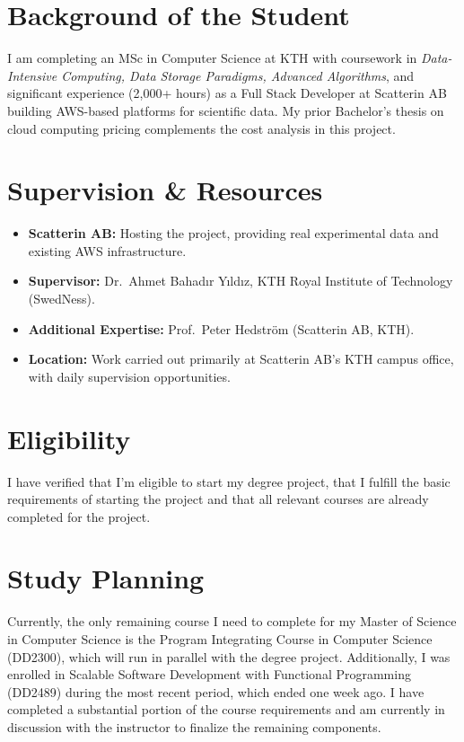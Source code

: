\documentclass{article}
\begin{document}
\section{Background of the Student}
I am completing an MSc in Computer Science at KTH with coursework in \emph{Data-Intensive Computing, Data Storage Paradigms, Advanced Algorithms}, and significant experience (2,000+ hours) as a Full Stack Developer at Scatterin AB building AWS-based platforms for scientific data. My prior Bachelor’s thesis on cloud computing pricing complements the cost analysis in this project.

\section{Supervision \& Resources}
\begin{itemize}
    \item \textbf{Scatterin AB:} Hosting the project, providing real experimental data and existing AWS infrastructure.
    \item \textbf{Supervisor:} Dr.~Ahmet Bahadır Yıldız, KTH Royal Institute of Technology (SwedNess).
    \item \textbf{Additional Expertise:} Prof.~Peter Hedström (Scatterin AB, KTH).
    \item \textbf{Location:} Work carried out primarily at Scatterin AB’s KTH campus office, with daily supervision opportunities.
\end{itemize}

\section{Eligibility}
I have verified that I'm eligible to start my degree project, that I fulfill the basic requirements of starting the project and that all relevant courses are already completed for the project.

\section{Study Planning}
Currently, the only remaining course I need to complete for my Master of Science in Computer Science is the Program Integrating Course in Computer Science (DD2300), which will run in parallel with the degree project. Additionally, I was enrolled in Scalable Software Development with Functional Programming (DD2489) during the most recent period, which ended one week ago. I have completed a substantial portion of the course requirements and am currently in discussion with the instructor to finalize the remaining components.

\printbibliography
\end{document}
